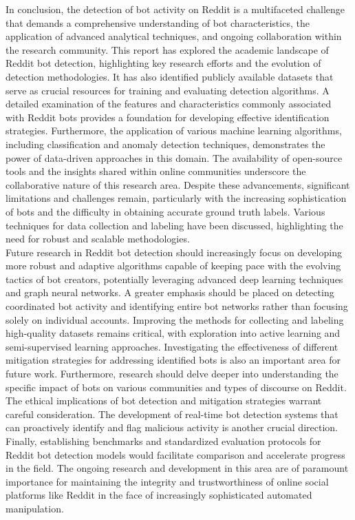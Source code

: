 \documentclass[
  12pt,
  letterpaper,
  DIV=11,
  numbers=noendperiod]{scrartcl}
\begin{document}
In conclusion, the detection of bot activity on Reddit is a multifaceted
challenge that demands a comprehensive understanding of bot
characteristics, the application of advanced analytical techniques, and
ongoing collaboration within the research community. This report has
explored the academic landscape of Reddit bot detection, highlighting
key research efforts and the evolution of detection methodologies. It
has also identified publicly available datasets that serve as crucial
resources for training and evaluating detection algorithms. A detailed
examination of the features and characteristics commonly associated with
Reddit bots provides a foundation for developing effective
identification strategies. Furthermore, the application of various
machine learning algorithms, including classification and anomaly
detection techniques, demonstrates the power of data-driven approaches
in this domain. The availability of open-source tools and the insights
shared within online communities underscore the collaborative nature of
this research area. Despite these advancements, significant limitations
and challenges remain, particularly with the increasing sophistication
of bots and the difficulty in obtaining accurate ground truth labels.
Various techniques for data collection and labeling have been discussed,
highlighting the need for robust and scalable methodologies.\\
Future research in Reddit bot detection should increasingly focus on
developing more robust and adaptive algorithms capable of keeping pace
with the evolving tactics of bot creators, potentially leveraging
advanced deep learning techniques and graph neural networks. A greater
emphasis should be placed on detecting coordinated bot activity and
identifying entire bot networks rather than focusing solely on
individual accounts. Improving the methods for collecting and labeling
high-quality datasets remains critical, with exploration into active
learning and semi-supervised learning approaches. Investigating the
effectiveness of different mitigation strategies for addressing
identified bots is also an important area for future work. Furthermore,
research should delve deeper into understanding the specific impact of
bots on various communities and types of discourse on Reddit. The
ethical implications of bot detection and mitigation strategies warrant
careful consideration. The development of real-time bot detection
systems that can proactively identify and flag malicious activity is
another crucial direction. Finally, establishing benchmarks and
standardized evaluation protocols for Reddit bot detection models would
facilitate comparison and accelerate progress in the field. The ongoing
research and development in this area are of paramount importance for
maintaining the integrity and trustworthiness of online social platforms
like Reddit in the face of increasingly sophisticated automated
manipulation.
\end{document}
